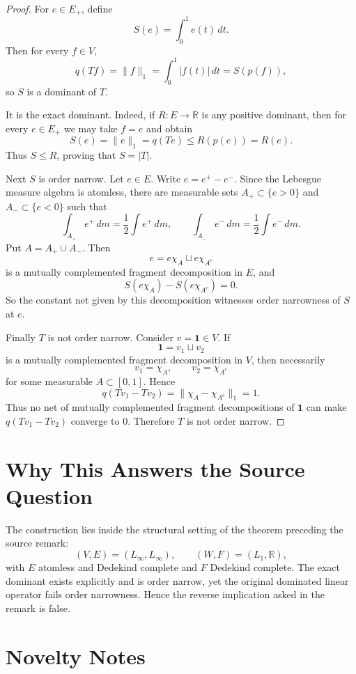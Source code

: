\documentclass[11pt]{article}
\newcommand{\R}{\mathbb R}
\newcommand{\one}{\mathbf 1}
\begin{document}
\begin{proof}
For \(e\in E_+\), define
\[
  S(e)=\int_0^1 e(t)\,dt.
\]
Then for every \(f\in V\),
\[
  q(Tf)=\|f\|_1=\int_0^1 |f(t)|\,dt=S(p(f)),
\]
so \(S\) is a dominant of \(T\).

It is the exact dominant.  Indeed, if \(R:E\to\R\) is any positive dominant,
then for every \(e\in E_+\) we may take \(f=e\) and obtain
\[
  S(e)=\|e\|_1=q(Te)\leq R(p(e))=R(e).
\]
Thus \(S\leq R\), proving that \(S=|T|\).

Next \(S\) is order narrow.  Let \(e\in E\).  Write \(e=e^+-e^-\).  Since the
Lebesgue measure algebra is atomless, there are measurable sets
\(A_+\subset\{e>0\}\) and \(A_-\subset\{e<0\}\) such that
\[
  \int_{A_+} e^+\,dm=\frac12\int e^+\,dm,
  \qquad
  \int_{A_-} e^-\,dm=\frac12\int e^-\,dm.
\]
Put \(A=A_+\cup A_-\).  Then
\[
  e=e\chi_A\sqcup e\chi_{A^c}
\]
is a mutually complemented fragment decomposition in \(E\), and
\[
  S(e\chi_A)-S(e\chi_{A^c})=0.
\]
So the constant net given by this decomposition witnesses order narrowness of
\(S\) at \(e\).

Finally \(T\) is not order narrow.  Consider \(v=\one\in V\).  If
\[
  \one=v_1\sqcup v_2
\]
is a mutually complemented fragment decomposition in \(V\), then necessarily
\[
  v_1=\chi_A,\qquad v_2=\chi_{A^c}
\]
for some measurable \(A\subset[0,1]\).  Hence
\[
  q(Tv_1-Tv_2)
  =\|\chi_A-\chi_{A^c}\|_1
  =1.
\]
Thus no net of mutually complemented fragment decompositions of \(\one\) can
make \(q(Tv_1-Tv_2)\) converge to \(0\).  Therefore \(T\) is not order narrow.
\end{proof}

\section*{Why This Answers the Source Question}

The construction lies inside the structural setting of the theorem preceding
the source remark:
\[
  (V,E)=(L_\infty,L_\infty),\qquad (W,F)=(L_1,\R),
\]
with \(E\) atomless and Dedekind complete and \(F\) Dedekind complete.  The
exact dominant exists explicitly and is order narrow, yet the original
dominated linear operator fails order narrowness.  Hence the reverse
implication asked in the remark is false.

\section*{Novelty Notes}
\end{document}
